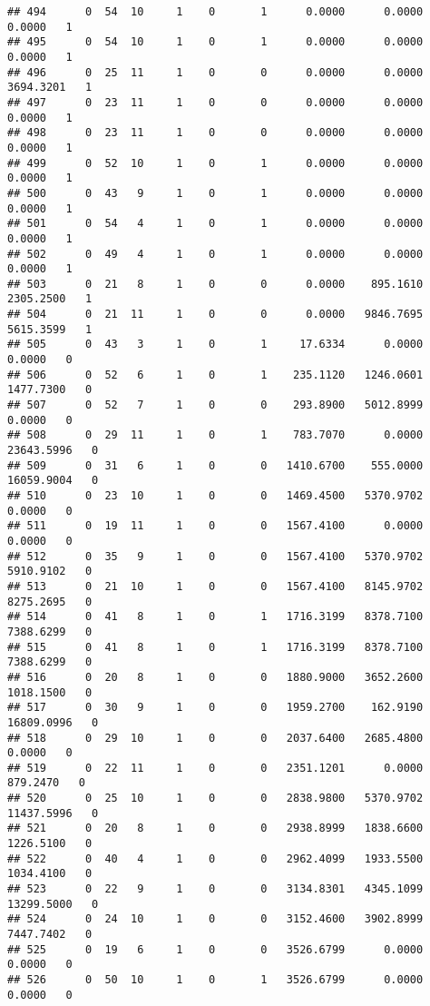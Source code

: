 \documentclass[
]{article}
\begin{document}
\begin{enumerate}
\begin{verbatim}
## 494      0  54  10     1    0       1      0.0000      0.0000      0.0000   1
## 495      0  54  10     1    0       1      0.0000      0.0000      0.0000   1
## 496      0  25  11     1    0       0      0.0000      0.0000   3694.3201   1
## 497      0  23  11     1    0       0      0.0000      0.0000      0.0000   1
## 498      0  23  11     1    0       0      0.0000      0.0000      0.0000   1
## 499      0  52  10     1    0       1      0.0000      0.0000      0.0000   1
## 500      0  43   9     1    0       1      0.0000      0.0000      0.0000   1
## 501      0  54   4     1    0       1      0.0000      0.0000      0.0000   1
## 502      0  49   4     1    0       1      0.0000      0.0000      0.0000   1
## 503      0  21   8     1    0       0      0.0000    895.1610   2305.2500   1
## 504      0  21  11     1    0       0      0.0000   9846.7695   5615.3599   1
## 505      0  43   3     1    0       1     17.6334      0.0000      0.0000   0
## 506      0  52   6     1    0       1    235.1120   1246.0601   1477.7300   0
## 507      0  52   7     1    0       0    293.8900   5012.8999      0.0000   0
## 508      0  29  11     1    0       1    783.7070      0.0000  23643.5996   0
## 509      0  31   6     1    0       0   1410.6700    555.0000  16059.9004   0
## 510      0  23  10     1    0       0   1469.4500   5370.9702      0.0000   0
## 511      0  19  11     1    0       0   1567.4100      0.0000      0.0000   0
## 512      0  35   9     1    0       0   1567.4100   5370.9702   5910.9102   0
## 513      0  21  10     1    0       0   1567.4100   8145.9702   8275.2695   0
## 514      0  41   8     1    0       1   1716.3199   8378.7100   7388.6299   0
## 515      0  41   8     1    0       1   1716.3199   8378.7100   7388.6299   0
## 516      0  20   8     1    0       0   1880.9000   3652.2600   1018.1500   0
## 517      0  30   9     1    0       0   1959.2700    162.9190  16809.0996   0
## 518      0  29  10     1    0       0   2037.6400   2685.4800      0.0000   0
## 519      0  22  11     1    0       0   2351.1201      0.0000    879.2470   0
## 520      0  25  10     1    0       0   2838.9800   5370.9702  11437.5996   0
## 521      0  20   8     1    0       0   2938.8999   1838.6600   1226.5100   0
## 522      0  40   4     1    0       0   2962.4099   1933.5500   1034.4100   0
## 523      0  22   9     1    0       0   3134.8301   4345.1099  13299.5000   0
## 524      0  24  10     1    0       0   3152.4600   3902.8999   7447.7402   0
## 525      0  19   6     1    0       0   3526.6799      0.0000      0.0000   0
## 526      0  50  10     1    0       1   3526.6799      0.0000      0.0000   0

\end{verbatim}
\end{enumerate}
\end{document}
